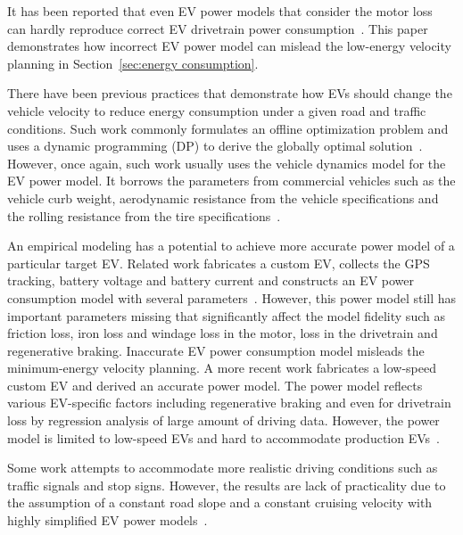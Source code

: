 \documentclass{IEEEtran}
\begin{document}
It has been reported that even EV power models that consider the motor loss~\cite{Lin:ICCA14, Wu:ITS15, Dib:IVPPC11} can hardly reproduce correct EV drivetrain power consumption~\cite{Hong:ASPDAC16}. This paper  demonstrates how incorrect EV power model can mislead the low-energy velocity planning in Section~\ref{sec:energy consumption}. 

There have been previous practices that demonstrate how EVs should change the vehicle velocity to reduce energy consumption under  a given road and traffic conditions. Such work commonly formulates an offline optimization problem and uses a dynamic programming (DP) to derive the globally optimal solution~\cite{Lin:ICCA14, Dib:IVPPC11, Dib:OGST12, Mensing:TR13}. However, once again, such work usually uses the vehicle dynamics model for the EV power model. It borrows the parameters from commercial vehicles such as the vehicle curb weight, aerodynamic resistance from the vehicle specifications and the rolling resistance from the tire specifications~\cite{Lin:ICCA14}. 

An empirical modeling has a potential to achieve more accurate power model  of a particular target EV. Related work fabricates a custom EV, collects the GPS tracking, battery voltage and battery current and constructs an EV power consumption model with several parameters~\cite{Dib:IVPPC11}. However, this power model still has important parameters missing that significantly affect the model fidelity such as friction loss, iron loss and windage loss in the motor, loss in the drivetrain and regenerative braking. Inaccurate EV power consumption model misleads the minimum-energy velocity planning. A more recent work fabricates a low-speed custom EV and derived an accurate power model. The power model reflects various EV-specific factors including regenerative braking and even for drivetrain loss by regression analysis of large amount of driving data. However, the power model is limited to low-speed EVs and hard to accommodate production EVs~\cite{Hong:ASPDAC16}. 

Some work attempts to accommodate more realistic driving conditions such as traffic signals and stop signs. However, the results are lack of practicality due to the assumption of a constant road slope and a constant cruising velocity with highly simplified EV power models~\cite{Yan:NAPS14, Dib:CEP14, Wu:ITS15}. 
\end{document}
